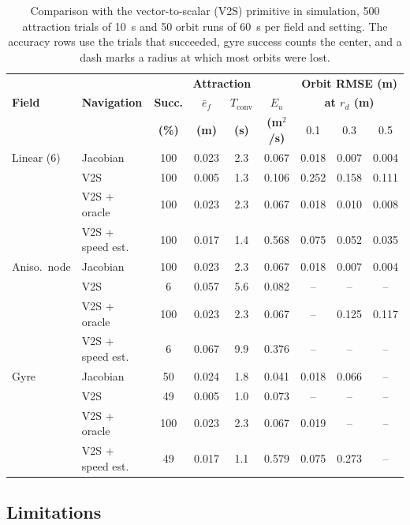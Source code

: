 \documentclass[lettersize,journal]{IEEEtran}
\newcommand{\rev}[1]{#1}
\begin{document}
\begin{table}[!t]
\centering
\scriptsize
\caption{Comparison with the vector-to-scalar (V2S) primitive in simulation, \rev{500} attraction trials of 10~s and \rev{50} orbit runs of 60~s per field and setting. The accuracy rows use the trials that succeeded, gyre success counts the center, and a dash marks a radius at which most orbits were lost.}
\label{tab:baselines}
\setlength{\tabcolsep}{1.8pt}
\rev{\begin{tabular}{ll|cccc|ccc}
\hline
 & & \multicolumn{4}{c|}{\textbf{Attraction}} & \multicolumn{3}{c}{\textbf{Orbit RMSE (m)}} \\
\textbf{Field} & \textbf{Navigation} & \textbf{Succ.} & \textbf{$\bar{e}_f$} & \textbf{$T_{\mathrm{conv}}$} & \textbf{$E_u$} & \multicolumn{3}{c}{\textbf{at $r_d$ (m)}} \\
 & & \textbf{(\%)} & \textbf{(m)} & \textbf{(s)} & \textbf{(m$^2$/s)} & 0.1 & 0.3 & 0.5 \\
\hline
Linear (6) & Jacobian & 100 & 0.023 & 2.3 & 0.067 & 0.018 & 0.007 & 0.004 \\
 & V2S & 100 & 0.005 & 1.3 & 0.106 & 0.252 & 0.158 & 0.111 \\
 & V2S + oracle & 100 & 0.023 & 2.3 & 0.067 & 0.018 & 0.010 & 0.008 \\
 & V2S + speed est. & 100 & 0.017 & 1.4 & 0.568 & 0.075 & 0.052 & 0.035 \\
\hline
Aniso.\ node & Jacobian & 100 & 0.023 & 2.3 & 0.067 & 0.018 & 0.007 & 0.004 \\
 & V2S & 6 & 0.057 & 5.6 & 0.082 & -- & -- & -- \\
 & V2S + oracle & 100 & 0.023 & 2.3 & 0.067 & -- & 0.125 & 0.117 \\
 & V2S + speed est. & 6 & 0.067 & 9.9 & 0.376 & -- & -- & -- \\
\hline
Gyre & Jacobian & 50 & 0.024 & 1.8 & 0.041 & 0.018 & 0.066 & -- \\
 & V2S & 49 & 0.005 & 1.0 & 0.073 & -- & -- & -- \\
 & V2S + oracle & 100 & 0.023 & 2.3 & 0.067 & 0.019 & -- & -- \\
 & V2S + speed est. & 49 & 0.017 & 1.1 & 0.579 & 0.075 & 0.273 & -- \\
\hline
\end{tabular}}
\end{table}

\subsection{Limitations}
\end{document}
